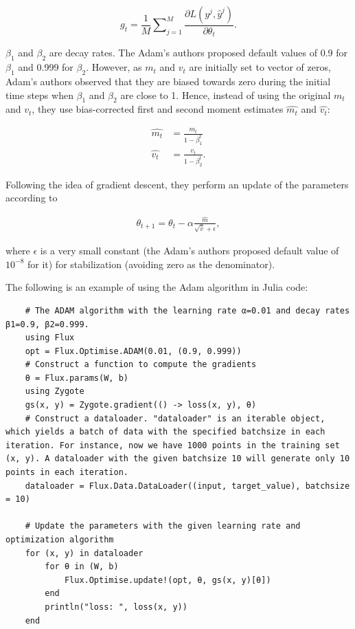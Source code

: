 \documentclass[
	parskip, 			   %
	twoside, 			   %
	DIV=14, 			   %
	BCOR=15.0mm, 		   %
	headsepline, 		   %
	open=right, 		   %
	captions=tableheading, %
	bibliography=totoc,    %
	numbers=noenddot       %
]{scrreprt}
\begin{document}
\begin{equation}
    \label{eq:mean_gradient}
    g_{t} = \frac{1}{M} \sum\nolimits_{j=1}^M \frac{\partial L (y^j, \hat{y}^j)}{\partial \theta_{t}}.
\end{equation}

$\beta_1$ and $\beta_2$ are decay rates. The Adam's authors proposed default values of 0.9 for $\beta_1$ and 0.999 for $\beta_2$. However, as $m_t$ and $v_t$ are initially set to vector of zeros, Adam's authors observed that they are biased towards zero during the initial time steps when $\beta_1$ and $\beta_2$ are close to 1. Hence, instead of using the original $m_t$ and $v_t$, they use bias-corrected first and second moment estimates $\hat{m_t}$ and $\hat{v_t}$:

\begin{equation}
    \label{eq:corrected_moment_estimate}
    \begin{aligned}
        \hat{m_t} &= \frac{m_t}{1-\beta_1^t}
        \\
        \hat{v_t} &= \frac{v_t}{1-\beta_2^t}.
    \end{aligned}
\end{equation}

Following the idea of gradient descent, they perform an update of the parameters according to

\begin{equation}
    \label{eq:Adam_GD}
    \begin{aligned}
        \theta_{t+1} = \theta_{t} - \alpha \frac{\hat{m}}{\sqrt{\hat{v}} + \epsilon},
    \end{aligned}
\end{equation}

where $\epsilon$ is a very small constant (the Adam's authors proposed default value of $10^{-8}$ for it) for stabilization (avoiding zero as the denominator). 

The following is an example of using the Adam algorithm in Julia code:

\begin{verbatim}
    # The ADAM algorithm with the learning rate α=0.01 and decay rates β1=0.9, β2=0.999.
    using Flux
    opt = Flux.Optimise.ADAM(0.01, (0.9, 0.999))
    # Construct a function to compute the gradients
    θ = Flux.params(W, b)
    using Zygote
    gs(x, y) = Zygote.gradient(() -> loss(x, y), θ)
    # Construct a dataloader. "dataloader" is an iterable object, which yields a batch of data with the specified batchsize in each iteration. For instance, now we have 1000 points in the training set (x, y). A dataloader with the given batchsize 10 will generate only 10 points in each iteration.
    dataloader = Flux.Data.DataLoader((input, target_value), batchsize = 10)
    
    # Update the parameters with the given learning rate and optimization algorithm
    for (x, y) in dataloader
        for θ in (W, b) 
            Flux.Optimise.update!(opt, θ, gs(x, y)[θ])
        end
        println("loss: ", loss(x, y))
    end
\end{verbatim}
\end{document}
